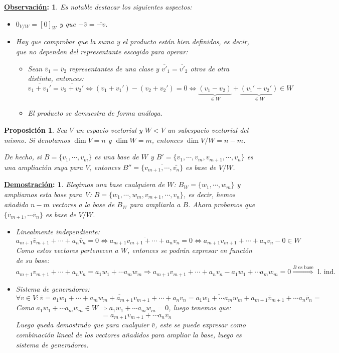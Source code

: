 \documentclass[10pt,a4paper,openright]{book}
\theoremstyle{break}
\newtheorem*{prop}{Proposición}
\newtheorem*{demo}{\underline{Demostración}:}
\newtheorem*{obs}{\underline{Observación}:}
\begin{document}
\begin{obs}
Es notable destacar los siguientes aspectos:
\begin{itemize}
\item $0_{V/W}=[0]_W$ y que $-\bar{v}=\overline{-v}$.
\item Hay que comprobar que la suma y el producto están bien definidos, es decir, que no dependen del representante escogido para operar:
	\begin{itemize}
	\item Sean $\overline{v}_1=\overline{v}_2$ representantes de una clase y $\overline{v'}_1=\overline{v'}_2$ otros de otra distinta, entonces:
$$\overline{v_1+v_1'}=\overline{v_2+v_2'}\Leftrightarrow (v_1+v_1')-(v_2+v_2')=0\Leftrightarrow \underbrace{(v_1-v_2)}_{\in W}+\underbrace{(v_1'+v_2')}_{\in W}\in W$$
	\item El producto se demuestra de forma análoga.
	\end{itemize}
\end{itemize}
\end{obs}

\begin{prop}
Sea $V$ un espacio vectorial y $W<V$ un subespacio vectorial del mismo. Si denotamos $\dim V=n$ y $\dim W=m$, entonces $\dim V/W=n-m$.

De hecho, si $B=\{v_1, \cdots , v_m\}$ es una base de $W$ y $B' = \{v_1, \cdots, v_m, v_{m+1}, \cdots, v_n\}$ es una ampliación suya para $V$, entonces $B'' = \{\bar{v_{m+1}, \cdots, \bar{v_{n}}}\}$ es base de $V/W$.
\end{prop}
\begin{demo}
Elegimos una base cualquiera de $W$: $B_W=\{w_1,\cdots,w_m\}$ y ampliamos esta base para V: $B=\{w_1,\cdots, w_m, v_{m+1}, \cdots, v_n\}$, es decir, hemos añadido $n-m$ vectores a la base de $B_W$ para ampliarla a $B$. Ahora probamos que $\{\overline{v}_{m+1},\cdots \overline{v}_n\}$ es base de $V/W$.

\begin{itemize}
\item Linealmente independiente:
$$a_{m+1}\overline{v}_{m+1}+\cdots +a_n\overline{v}_n=0\Leftrightarrow \overline{a_{m+1}v_{m+1}+\cdots +a_nv_n}=0\Leftrightarrow a_{m+1}v_{m+1}+\cdots +a_nv_n- 0\in W$$
Como estos vectores pertenecen a $W$, entonces se podrán expresar en función de su base:
$$a_{m+1}v_{m+1}+\cdots +a_nv_n=a_1w_1+\cdots a_mw_m\Rightarrow a_{m+1}v_{m+1}+\cdots +a_nv_n-a_1w_1+\cdots a_mw_m=0\stackrel{B\mbox{ es base}}{\Rightarrow}\mbox{ l. ind.}$$

\item Sistema de generadores:
$$\forall v\in V: \overline{v}=\overline{a_1w_1+\cdots+a_mw_m+a_{m+1}v_{m+1}+\cdots+ a_nv_n}=\overline{a_1w_1+\cdots a_mw_m}+a_{m+1}\overline{v}_{m+1}+\cdots a_n\overline{v}_n=$$
Como $a_1w_1+\cdots a_mw_m\in W\Rightarrow \overline{a_1w_1+\cdots a_mw_m}=0$, luego tenemos que:
$$=a_{m+1}\overline{v}_{m+1}+\cdots a_n\overline{v}_n$$
Luego queda demostrado que para cualquier $\bar{v}$, este se puede expresar como combinación lineal de los vectores añadidos para ampliar la base, luego es sistema de generadores.
\end{itemize}
\end{demo}
\end{document}
